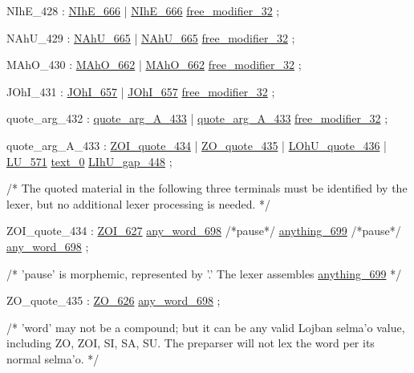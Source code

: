 \label{html:y428}
NIhE_428                :  \hyperref[html:y666]{NIhE_666}
                        |  \hyperref[html:y666]{NIhE_666}  \hyperref[html:y32]{free_modifier_32}
                        ;

\label{html:y429}
NAhU_429                :  \hyperref[html:y665]{NAhU_665}
                        |  \hyperref[html:y665]{NAhU_665}  \hyperref[html:y32]{free_modifier_32}
                        ;

\label{html:y430}
MAhO_430                :  \hyperref[html:y662]{MAhO_662}
                        |  \hyperref[html:y662]{MAhO_662}  \hyperref[html:y32]{free_modifier_32}
                        ;

\label{html:y431}
JOhI_431                :  \hyperref[html:y657]{JOhI_657}
                        |  \hyperref[html:y657]{JOhI_657}  \hyperref[html:y32]{free_modifier_32}
                        ;

\label{html:y432}
quote_arg_432           :  \hyperref[html:y433]{quote_arg_A_433}
                        |  \hyperref[html:y433]{quote_arg_A_433}  \hyperref[html:y32]{free_modifier_32}
                        ;

\label{html:y433}
quote_arg_A_433         :  \hyperref[html:y434]{ZOI_quote_434}
                        |  \hyperref[html:y435]{ZO_quote_435}
                        |  \hyperref[html:y436]{LOhU_quote_436}
                        |  \hyperref[html:y571]{LU_571}  \hyperref[html:y0]{text_0}  \hyperref[html:y448]{LIhU_gap_448}
                        ;

/* The quoted material in the following three terminals must be identified by
   the lexer, but no additional lexer processing is needed. */

\label{html:y434}
ZOI_quote_434           :  \hyperref[html:y627]{ZOI_627}  \hyperref[html:y698]{any_word_698}
                                  /*pause*/  \hyperref[html:y699]{anything_699}  /*pause*/  \hyperref[html:y698]{any_word_698}
                        ;

/* 'pause' is morphemic, represented by '.' The lexer assembles \hyperref[html:y699]{anything_699} */

\label{html:y435}
ZO_quote_435            :  \hyperref[html:y626]{ZO_626}  \hyperref[html:y698]{any_word_698}
                        ;

/* 'word' may not be a compound; but it can be any valid Lojban selma'o value,
   including ZO, ZOI, SI, SA, SU. The preparser will not lex the word per its
   normal selma'o. */

